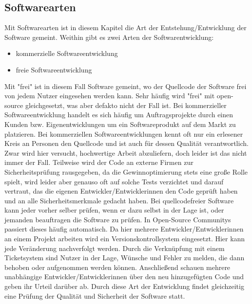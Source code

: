 \subsection{Softwarearten}
Mit Softwarearten ist in diesem Kapitel die Art der Entstehung/Entwicklung
der Software gemeint.
Weithin gibt es zwei Arten der Softwarentwicklung:
\begin{itemize}
  \item kommerzielle Softwareentwicklung
  \item freie Softwareentwicklung
\end{itemize}
Mit "frei" ist in diesem Fall Software gemeint, wo der Quellcode der
Software frei von jedem Nutzer eingesehen werden kann. Sehr häufig wird
"frei" mit open-source gleichgesetzt, was aber defakto nicht der Fall ist.
Bei kommerzieller Softwareentwicklung handelt es sich häufig um 
Auftragsprojekte durch einen Kunden bzw. Eigenentwicklungen um ein
Softwareprodukt auf dem Markt zu platzieren.
Bei kommerziellen Softwareentwicklungen kennt oft nur ein erlesener Kreis
an Personen den Quellcode und ist auch für dessen Qualität verantwortlich.
Zwar wird hier versucht, hochwertige Arbeit abzuliefern, doch leider
ist das nicht immer der Fall. Teilweise wird der Code an externe
Firmen zur Sicherheitsprüfung rausgegeben, da die Gewinnoptimierung 
stets eine große Rolle spielt, wird leider aber genauso oft auf solche Tests
verzichtet und darauf vertraut, das die eigenen Entwickler/Entwicklerinnen
den Code geprüft haben und an alle Sicherheitsmerkmale gedacht haben.
Bei quellcodefreier Software kann jeder vorher selber prüfen, wenn er dazu
selbst in der Lage ist, oder jemanden beauftragen die Software zu prüfen.
In Open-Source Communitys passiert dieses häufig automatisch. Da hier 
mehrere Entwickler/Entwicklerinnen an einem Projekt arbeiten wird ein
Versionskontrollsystem eingesetzt. Hier kann jede Veränderung nachverfolgt 
werden. Durch die Verknüpfung mit einem Ticketsystem sind Nutzer in der 
Lage, Wünsche und Fehler zu melden, die dann behoben oder
aufgenommen werden können. Anschließend schauen mehrere unabhängige 
Entwickler/Entwicklerinnen über den neu hinzugefügten Code und geben
ihr Urteil darüber ab. 
Durch diese Art der Entwicklung findet gleichzeitig eine Prüfung der
Qualität und Sicherheit der Software statt.  


